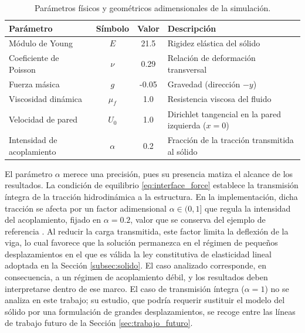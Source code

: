 \documentclass[12pt, letterpaper]{report}
\theoremstyle{definition}
\begin{document}
\begin{table}[H]
    \centering
    \renewcommand{\arraystretch}{1.2}
    \begin{tabular}{|>{\raggedright\arraybackslash}p{4.2cm}|c|c|>{\raggedright\arraybackslash}p{5.6cm}|}
        \hline
        \textbf{Parámetro} & \textbf{Símbolo} & \textbf{Valor} & \textbf{Descripción} \\ \hline
        Módulo de Young & $E$ & 21.5 & Rigidez elástica del sólido \\ \hline
        Coeficiente de Poisson & $\nu$ & 0.29 & Relación de deformación transversal \\ \hline
        Fuerza másica & $g$ & -0.05 & Gravedad (dirección $-y$) \\ \hline
        Viscosidad dinámica & $\mu_f$ & 1.0 & Resistencia viscosa del fluido \\ \hline
        Velocidad de pared & $U_0$ & 1.0 & Dirichlet tangencial en la pared izquierda ($x=0$) \\ \hline
        Intensidad de acoplamiento & $\alpha$ & 0.2 & Fracción de la tracción transmitida al sólido \\ \hline
    \end{tabular}
    \caption{Parámetros físicos y geométricos adimensionales de la simulación.}
    \label{tab:parametros}
\end{table}

El parámetro $\alpha$ merece una precisión, pues su presencia matiza el alcance de los resultados. La condición de equilibrio \eqref{eq:interface_force} establece la transmisión íntegra de la tracción hidrodinámica a la estructura. En la implementación, dicha tracción se afecta por un factor adimensional $\alpha \in (0,1]$ que regula la intensidad del acoplamiento, fijado en $\alpha = 0.2$, valor que se conserva del ejemplo de referencia \cite{manualfreefem}. Al reducir la carga transmitida, este factor limita la deflexión de la viga, lo cual favorece que la solución permanezca en el régimen de pequeños desplazamientos en el que es válida la ley constitutiva de elasticidad lineal adoptada en la Sección \ref{subsec:solido}. El caso analizado corresponde, en consecuencia, a un régimen de acoplamiento débil, y los resultados deben interpretarse dentro de ese marco. El caso de transmisión íntegra ($\alpha = 1$) no se analiza en este trabajo; su estudio, que podría requerir sustituir el modelo del sólido por una formulación de grandes desplazamientos, se recoge entre las líneas de trabajo futuro de la Sección \ref{sec:trabajo_futuro}.
\end{document}
